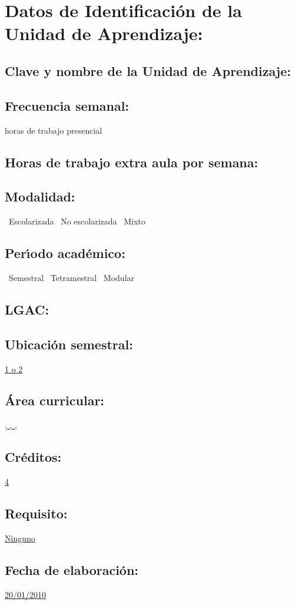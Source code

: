 \documentclass[10 pt]{article}
\begin{document}


\section{Datos de Identificaci\'{o}n de la Unidad de Aprendizaje:}
\subsection{Clave y nombre de la Unidad de Aprendizaje:} 
\subsection{Frecuencia semanal:} horas de trabajo presencial 
\subsection{Horas de trabajo extra aula por semana:} 
\subsection{Modalidad:} \yes~Escolarizada \no~No escolarizada \no~Mixto
\subsection{Per\'{\i}odo acad\'{e}mico:} \yes~Semestral
\no~Tetramestral \no~Modular
\subsection{LGAC:} \underline{\seys}
\subsection{Ubicaci\'{o}n semestral:} \underline{1 o 2}
\subsection{\'{A}rea curricular:} \underline{\fb, \fa, \da, \le \inv}
\subsection{Cr\'{e}ditos:} \underline{4}
\subsection{Requisito:} \underline{Ninguno}
\subsection{Fecha de elaboraci\'{o}n:} \underline{20/01/2010}
\end{document}
